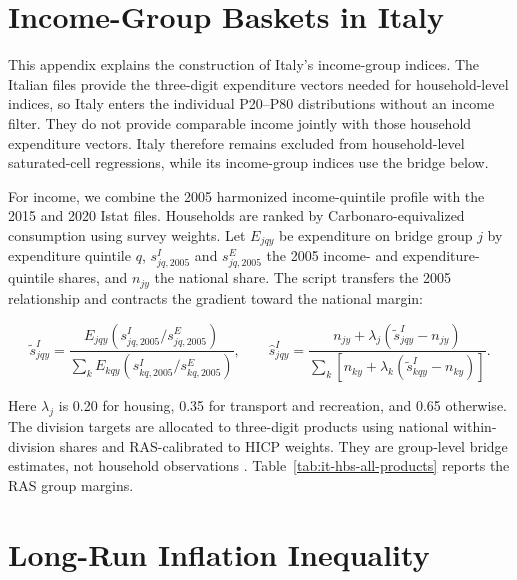 \documentclass[11pt]{article}
\begin{document}
\clearpage

\section{Income-Group Baskets in Italy}
\label{sec:app-italy-hbs}

\begingroup
\footnotesize
This appendix explains the construction of Italy's income-group indices. The Italian files provide
the three-digit expenditure vectors needed for household-level indices, so Italy enters the individual
P20--P80 distributions without an income filter. They do not provide comparable income jointly with
those household expenditure vectors. Italy therefore remains excluded from household-level
saturated-cell regressions, while its income-group indices use the bridge below.

For income, we combine the 2005 harmonized income-quintile profile with the 2015 and 2020 Istat
files. Households are ranked by Carbonaro-equivalized consumption using survey weights. Let $E_{jqy}$
be expenditure on bridge group $j$ by expenditure quintile $q$, $s^{I}_{jq,2005}$ and
$s^{E}_{jq,2005}$ the 2005 income- and expenditure-quintile shares, and $n_{jy}$ the national share.
The script transfers the 2005 relationship and contracts the gradient toward the national margin:

\begin{equation}
\widetilde{s}^{I}_{jqy}
=
\frac{E_{jqy}\left(s^{I}_{jq,2005}/s^{E}_{jq,2005}\right)}
{\sum_k E_{kqy}\left(s^{I}_{kq,2005}/s^{E}_{kq,2005}\right)},
\qquad
\widehat{s}^{I}_{jqy}
=
\frac{n_{jy}+\lambda_j\left(\widetilde{s}^{I}_{jqy}-n_{jy}\right)}
{\sum_k\left[n_{ky}+\lambda_k\left(\widetilde{s}^{I}_{kqy}-n_{ky}\right)\right]}.
\label{eq:italy-income-expenditure-bridge}
\end{equation}

Here $\lambda_j$ is 0.20 for housing, 0.35 for transport and recreation, and 0.65 otherwise.
The division targets are allocated to three-digit products using national within-division shares and
RAS-calibrated to HICP weights. They are group-level bridge estimates, not household observations
\citep{donatiello2022joint}. Table~\ref{tab:it-hbs-all-products} reports the RAS group margins.


\endgroup

\clearpage

\section{Long-Run Inflation Inequality}
\label{sec:app-long-run-inflation}
\end{document}
